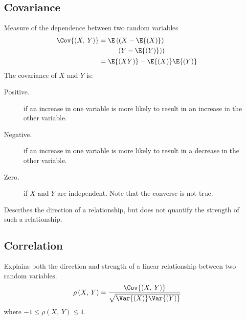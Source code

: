 \documentclass{article}
\begin{document}
\begin{multicols}{3}
    \subsection{Covariance}
    Measure of the dependence between two random variables
    \begin{align*}
        \Cov{\left( X,\: Y \right)} & =
                                        \begin{aligned}[t]
                                            \E\left( \left( X - \E{\left( X \right)} \right) \right. & \\
                                            \left. \left( Y - \E{\left( Y \right)} \right) \right)   &
                                        \end{aligned}
        \\
                                    & = \E{\left( XY \right)} - \E{\left( X \right)} \E{\left( Y \right)}
    \end{align*}
    The covariance of \(X\) and \(Y\) is:
    \begin{description}
        \item[Positive.] if an increase in one variable is more likely
              to result in an increase in the other variable.
        \item[Negative.] if an increase in one variable is more likely
              to result in a decrease in the other variable.
        \item[Zero.] if \(X\) and \(Y\) are independent. Note that the
              converse is not true.
    \end{description}
    Describes the direction of a relationship, but does not quantify the strength of such a relationship.
    \subsection{Correlation}
    Explains both the direction and strength of a linear relationship
    between two random variables.
    \begin{equation*}
        \rho\left( X,\: Y \right) = \frac{\Cov{\left( X,\: Y \right)}}{\sqrt{\Var{\left( X \right)} \Var{\left( Y \right)}}}
    \end{equation*}
    where \(-1 \leq \rho\left( X,\: Y \right) \leq 1\).


\end{multicols}
\end{document}
